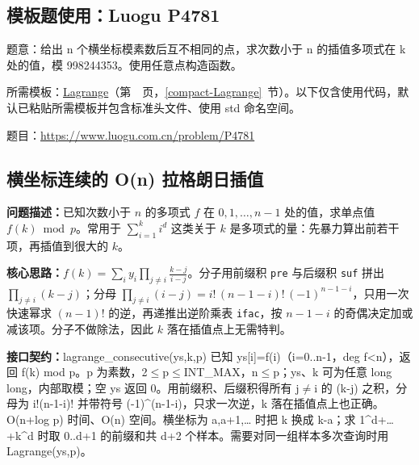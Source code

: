\subsection*{模板题使用：Luogu P4781}

\label{usage-example-17}

题意：给出 n 个横坐标模素数后互不相同的点，求次数小于 n 的插值多项式在 k 处的值，模 998244353。使用任意点构造函数。

所需模板：\hyperref[compact-Lagrange]{Lagrange}（第~\pageref{compact-Lagrange}~页，\ref{compact-Lagrange}~节）。以下仅含使用代码，默认已粘贴所需模板并包含标准头文件、使用 std 命名空间。

题目：\url{https://www.luogu.com.cn/problem/P4781}



\Needspace{556pt}

\subsection{横坐标连续的 O(n) 拉格朗日插值}\label{compact-lagrange_consecutive}

\noindent\textbf{问题描述：}\allowbreak 已知次数小于 $n$ 的多项式 $f$ 在 $0,1,\dots,n-1$ 处的值，求单点值 $f(k)\bmod p$。常用于 $\sum_{i=1}^{k}i^d$ 这类关于 $k$ 是多项式的量：先暴力算出前若干项，再插值到很大的 $k$。

\textbf{核心思路：}\allowbreak $f(k)=\sum_i y_i\prod_{j\ne i}\frac{k-j}{i-j}$。分子用前缀积 \texttt{pre} 与后缀积 \texttt{suf} 拼出 $\prod_{j\ne i}(k-j)$；分母 $\prod_{j\ne i}(i-j)=i!\,(n-1-i)!\,(-1)^{n-1-i}$，只用一次快速幂求 $(n-1)!$ 的逆，再递推出逆阶乘表 \texttt{ifac}，按 $n-1-i$ 的奇偶决定加或减该项。分子不做除法，因此 $k$ 落在插值点上无需特判。



{\sloppy{}\noindent\textbf{接口契约：}lagrange\_consecutive(ys,k,p) 已知 ys[i]=f(i)（i=0..n-1，deg f<n），返回 f(k) mod p。p 为素数，2$\le$p$\le$INT\_MAX，n$\le$p；ys、k 可为任意 long long，内部取模；空 ys 返回 0。用前缀积、后缀积得所有 j$\ne$i 的 (k-j) 之积，分母为 i!(n-1-i)! 并带符号 (-1)\textasciicircum{}(n-1-i)，只求一次逆，k 落在插值点上也正确。O(n+log p) 时间、O(n) 空间。横坐标为 a,a+1,… 时把 k 换成 k-a；求 1\textasciicircum{}d+…+k\textasciicircum{}d 时取 0..d+1 的前缀和共 d+2 个样本。需要对同一组样本多次查询时用 Lagrange(ys,p)。\par}



